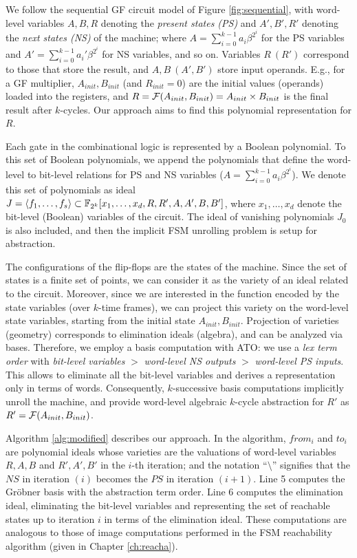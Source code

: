 We follow  the sequential GF circuit model of
Figure \ref{fig:sequential}, with word-level variables $A, B, R$
denoting the {\it present states (PS)} and $A', B', R'$ denoting the {\it next
  states (NS)} of the machine; where $A = \sum_{i=0}^{k-1} a_i \beta^{2^i}$
for the PS variables and $A' = \sum_{i=0}^{k-1} a_i'
\beta^{2^i}$ for NS variables, and so on.  Variables $R\ (R')$ correspond to those that 
store the result, and $A, B\ (A', B')$ store input operands. E.g.,
for a GF multiplier, $A_{init}, B_{init}$ (and $R_{init} =
0$) are the initial values (operands) loaded into the registers,  and
$R = {\mathcal{F}}(A_{init}, B_{init}) = A_{init} \times B_{init}$ is the final
result after $k$-cycles. Our approach aims to find this polynomial
representation for $R$.  

Each gate in the combinational logic is represented by a Boolean
polynomial. To 
this set of Boolean polynomials, we append the polynomials that define
the word-level to bit-level relations for PS and NS variables ($A =
\sum_{i=0}^{k-1} a_i \beta^{2^i}$). We denote this set of polynomials
as ideal $J = \langle 
f_1, \dots, f_s \rangle \subset {\mathbb{F}}_{2^k}[x_1, \dots, x_d, R, R', A, A', B,
  B']$, where $x_1, \dots, x_d$ denote the bit-level (Boolean) variables
  of the circuit. The ideal of vanishing polynomials $J_0$ is also included, and
then the implicit FSM unrolling problem is setup for abstraction. 

The configurations of the flip-flops are the states of the
machine. Since the set of states is a finite set of points, we
can consider it as the variety of an ideal related to the circuit.
Moreover, since we are interested in
the function encoded by the state variables (over $k$-time
frames), we can project this variety on the word-level state
variables, starting from the initial state $A_{init}, B_{init}$.
Projection of varieties (geometry) corresponds to elimination ideals
(algebra), and can be analyzed via \Grobner bases. Therefore, we
employ a \Grobner basis computation with ATO: we use a {\it lex term
  order} with {\it bit-level variables} 
$>$ {\it word-level NS outputs} $>$ {\it word-level PS inputs}. This
allows to eliminate all the bit-level variables 
and derives a representation only in terms of words. 
Consequently, $k$-successive \Grobner basis computations implicitly
unroll the machine, and provide word-level algebraic $k$-cycle
abstraction for $R'$ as $R' = {\mathcal{F}}(A_{init}, B_{init})$. 

Algorithm
\ref{alg:modified} describes our approach.  In the algorithm, $from_i$
and $to_i$ are polynomial ideals whose varieties are the valuations of
word-level variables $R, A, B$ and $R',A',B'$ in the $i$-th iteration;
and the notation ``$\setminus$'' signifies that the $NS$ in iteration
$(i)$ becomes the $PS$ in iteration $(i+1)$. Line 5 computes the Gr\"obner 
basis with the abstraction term order.  Line 6 computes the elimination 
ideal, eliminating the bit-level variables and representing the set of 
reachable states up to iteration $i$ in terms of the elimination ideal. 
These computations are analogous to those of image computations performed in 
the FSM reachability algorithm (given in Chapter \ref{ch:reacha}).

